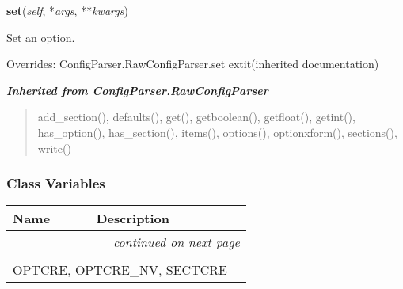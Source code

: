     \vspace{0.5ex}

\hspace{.8\funcindent}\begin{boxedminipage}{\funcwidth}

    \raggedright \textbf{set}(\textit{self}, *\textit{args}, **\textit{kwargs})

\setlength{\parskip}{2ex}
    Set an option.

\setlength{\parskip}{1ex}
      Overrides: ConfigParser.RawConfigParser.set 	extit{(inherited documentation)}

    \end{boxedminipage}


\large{\textbf{\textit{Inherited from ConfigParser.RawConfigParser}}}

\begin{quote}
add\_section(), defaults(), get(), getboolean(), getfloat(), getint(), has\_option(), has\_section(), items(), options(), optionxform(), sections(), write()
\end{quote}


  \subsubsection{Class Variables}

    \vspace{-1cm}
\hspace{\varindent}\begin{longtable}{|p{\varnamewidth}|p{\vardescrwidth}|l}
\cline{1-2}
\cline{1-2} \centering \textbf{Name} & \centering \textbf{Description}& \\
\cline{1-2}
\endhead\cline{1-2}\multicolumn{3}{r}{\small\textit{continued on next page}}\\\endfoot\cline{1-2}
\endlastfoot\multicolumn{2}{|l|}{\textit{Inherited from ConfigParser.RawConfigParser}}\\
\multicolumn{2}{|p{\varwidth}|}{\raggedright OPTCRE, OPTCRE\_NV, SECTCRE}\\
\cline{1-2}
\end{longtable}

